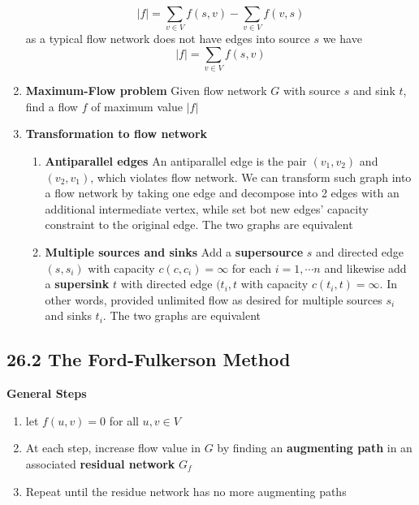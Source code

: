 \documentclass[11pt]{article}
\begin{document}
\begin{defn*}
\begin{enumerate}
        \[
            |f| = \sum_{v\in V} f(s,v) - \sum_{v\in V} f(v,s)
        \]
        as a typical flow network does not have edges into source $s$ we have 
        \[
            |f| =  \sum_{v\in V} f(s,v)
        \]
        \item \textbf{Maximum-Flow problem} Given flow network $G$ with source $s$ and sink $t$, find a flow $f$ of maximum value $|f|$
        \item \textbf{Transformation to flow network}
        \begin{enumerate}
            \item \textbf{Antiparallel edges} An antiparallel edge is the pair $(v_1, v_2)$ and $(v_2, v_1)$, which violates flow network. We can transform such graph into a flow network by taking one edge and decompose into 2 edges with an additional intermediate vertex, while set bot new edges' capacity constraint to the original edge. The two graphs are equivalent 
            \item \textbf{Multiple sources and sinks} Add a \textbf{supersource} $s$ and directed edge $(s, s_i)$ with capacity $c(c, c_i) = \infty$ for each $i = 1,\cdots n$ and likewise add a \textbf{supersink} $t$ with directed edge $(t_i, t$ with capacity $c(t_i, t) = \infty$. In other words, provided unlimited flow as desired for multiple sources $s_i$ and sinks $t_i$. The two graphs are equivalent 
        \end{enumerate}
    \end{enumerate}
\end{defn*}


\subsection*{26.2 The Ford-Fulkerson Method} 


\begin{defn*}
    \textbf{General Steps}
    \begin{enumerate}
        \item let $f(u,v) = 0$ for all $u,v\in V$
        \item At each step, increase flow value in $G$ by finding an \textbf{augmenting path} in an associated \textbf{residual network} $G_f$
        \item Repeat until the residue network has no more augmenting paths
    \end{enumerate}
\end{defn*}
\end{document}
